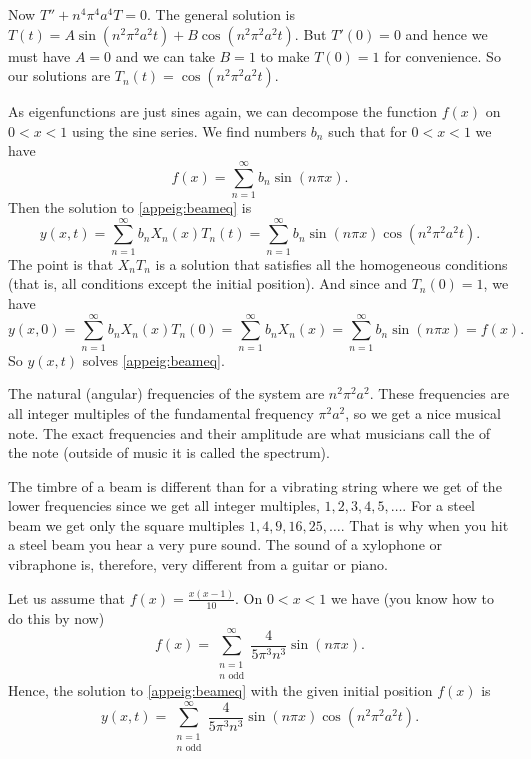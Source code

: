 \documentclass[12pt]{book}
\begin{document}
Now 
$T'' + n^4 \pi^4 a^4 T = 0$.  The general solution is $T(t) =
A \sin (n^2 \pi^2 a^2 t) + B \cos (n^2 \pi^2 a^2 t)$.  But $T'(0) = 0$ and hence
we must have $A=0$ and we can take $B=1$ to make $T(0) = 1$ for convenience.
So our solutions are $T_n(t) = \cos (n^2 \pi^2 a^2 t)$.

As eigenfunctions are just sines again, we can decompose the function
$f(x)$ on $0 < x < 1$ using the sine series.
We find numbers $b_n$ such that for
$0 < x < 1$ we have
\begin{equation*}
f(x) = \sum_{n=1}^\infty b_n \sin (n \pi x) .
\end{equation*}
Then the solution to \eqref{appeig:beameq} is
\begin{equation*}
y(x,t) = \sum_{n=1}^\infty b_n
X_n(x) T_n(t)
= \sum_{n=1}^\infty b_n
\sin (n \pi x)  \cos ( n^2 \pi^2 a^2 t ) .
\end{equation*}
The point is that $X_nT_n$ is a solution that satisfies all the homogeneous
conditions (that is, all conditions except the initial position).  And since
and $T_n(0) = 1$, we have
\begin{equation*}
y(x,0) = \sum_{n=1}^\infty b_n X_n(x) T_n(0) = 
\sum_{n=1}^\infty b_n X_n(x) =
\sum_{n=1}^\infty b_n
\sin (n \pi x) = f(x) .
\end{equation*}
So $y(x,t)$ solves \eqref{appeig:beameq}.

The natural (angular) frequencies of the system are $n^2 \pi^2 a^2$.
These frequencies are all integer multiples of the fundamental frequency
$\pi^2 a^2$, so we get a nice musical note.  The exact frequencies
and their amplitude
are what musicians call the \emph{} of the note (outside
of music it is called the spectrum).

The timbre of a beam
is different than for a vibrating string where we get 
of the lower frequencies since we get all integer multiples,
$1,2,3,4,5,\ldots$.  For a steel beam we get
only the square multiples $1,4,9,16,25,\ldots$.  That is why when you hit a
steel beam you hear a very pure sound.  The sound of a
xylophone or vibraphone is, therefore, very different from a guitar or piano.

\begin{example}
Let us assume that $f(x) = \frac{x(x-1)}{10}$.  
On $0 < x < 1$ we have (you know how to do this by now)
\begin{equation*}
f(x) = \sum_{\substack{n=1\\n \text{~odd}}}^\infty \frac{4}{5\pi^3 n^3}
\sin (n \pi x) .
\end{equation*}
Hence, the solution to \eqref{appeig:beameq} with the given initial
position $f(x)$ is
\begin{equation*}
y(x,t) = \sum_{\substack{n=1\\n \text{~odd}}}^\infty \frac{4}{5\pi^3 n^3}
\sin (n \pi x) \cos ( n^2 \pi^2 a^2 t ) .
\end{equation*}
\end{example}
\end{document}
